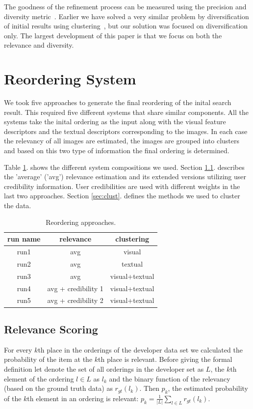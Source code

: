 \documentclass{acm_proc_article-me}
\begin{document}
The goodness of the refinement process can be measured using the precision and diversity metric~\cite{Taneva:2010:GRP:1718487.1718541}. Earlier we have solved a very similar problem by diversification of initial results using clustering~\cite{szHucs2013bmemtm}, but our solution was focused on diversification only. The largest development of this paper is that we focus on both the relevance and diversity.

\section{Reordering System}

We took five approaches to generate the final reordering of the inital search result. This required five different systems that share similar components. All the systems take the inital ordering as the input along with the visual feature descriptors and the textual descriptors corresponding to the images. In each case the relevancy of all images are estimated, the images are grouped into clusters and based on this two type of information the final ordering is determined.

Table \ref{table:runs}. shows the different system compositions we used. Section \ref{sec:relevance}. describes the 'average' ('avg') relevance estimation and its extended versions utilizing user credibility information. User credibilities are used with different weights in the last two approaches. Section \ref{sec:clust}. defines the methods we used to cluster the data.

\begin{table}[h]
\centering
\begin{tabular}{|c|c|c|}
	\hline 
	run name & relevance & clustering\tabularnewline
	\hline 
	\hline 
	run1 & avg & visual\tabularnewline
	\hline 
	run2 & avg & textual\tabularnewline
	\hline 
	run3 & avg & visual+textual\tabularnewline
	\hline 
	run4 & avg + credibility 1 & visual+textual\tabularnewline
	\hline 
	run5 & avg + credibility 2 & visual+textual\tabularnewline
	\hline 
\end{tabular}
\caption{Reordering approaches.}
\label{table:runs}
\end{table}

\subsection{Relevance Scoring}
\label{sec:relevance}

For every $k$th place in the orderings of the developer data set we calculated the probability of the item at the $k$th place is relevant. Before giving the formal definition let denote the set of all orderings in the developer set as $L$, the $k$th element of the ordering $l \in L$ as $l_k$ and the binary function of the relevancy (based on the ground truth data) as $r_{gt}(l_k)$. Then $p_k$, the estimated probability of the $k$th element in an ordering is relevant:
$p_k = \frac{1}{|L|}\sum_{l \in L}r_{gt}(l_k)$.
\end{document}
